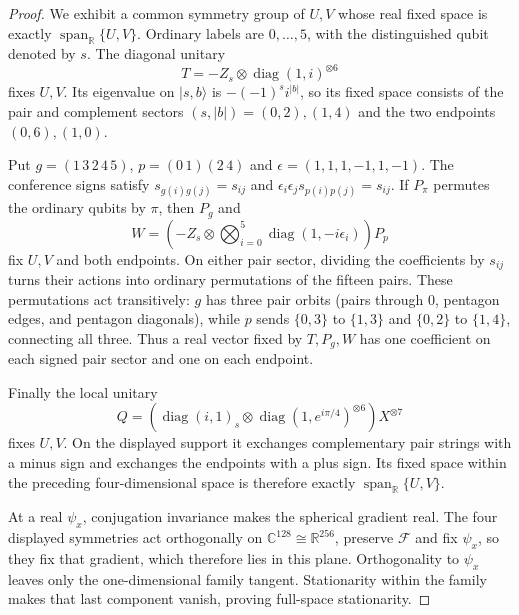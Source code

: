 \begin{proof}
We exhibit a common symmetry group of $U,V$ whose real fixed space is
exactly $\operatorname{span}_{\mathbb R}\{U,V\}$. Ordinary labels are $0,\ldots,5$,
with the distinguished qubit denoted by $s$.
The diagonal unitary
\[
 T=-Z_s\otimes\operatorname{diag}(1,i)^{\otimes6}
\]
fixes $U,V$. Its eigenvalue on $|s,b\rangle$ is $-(-1)^s i^{|b|}$,
so its fixed space consists of the pair and complement sectors
$(s,|b|)=(0,2),(1,4)$ and the two endpoints $(0,6),(1,0)$.

Put $g=(1\,3\,2\,4\,5)$, $p=(0\,1)(2\,4)$ and
$\epsilon=(1,1,1,-1,1,-1)$. The conference signs satisfy
$s_{g(i)g(j)}=s_{ij}$ and
$\epsilon_i\epsilon_j s_{p(i)p(j)}=s_{ij}$.
If $P_\pi$ permutes the ordinary qubits by $\pi$, then $P_g$ and
\[
 W=\left(-Z_s\otimes\bigotimes_{i=0}^5
           \operatorname{diag}(1,-i\epsilon_i)\right)P_p
\]
fix $U,V$ and both endpoints. On either pair sector, dividing the
coefficients by $s_{ij}$ turns their actions into ordinary permutations
of the fifteen pairs. These permutations act transitively: $g$ has
three pair orbits (pairs through $0$, pentagon edges, and pentagon
diagonals), while $p$ sends $\{0,3\}$ to $\{1,3\}$ and
$\{0,2\}$ to $\{1,4\}$, connecting all three.
Thus a real vector fixed by $T,P_g,W$ has one coefficient on each
signed pair sector and one on each endpoint.

Finally the local unitary
\[
 Q=\left(\operatorname{diag}(i,1)_s\otimes
       \operatorname{diag}(1,e^{i\pi/4})^{\otimes6}\right)X^{\otimes7}
\]
fixes $U,V$. On the displayed support it exchanges complementary
pair strings with a minus sign and exchanges the endpoints with a
plus sign. Its fixed space within the preceding four-dimensional
space is therefore exactly $\operatorname{span}_{\mathbb R}\{U,V\}$.

At a real $\psi_x$, conjugation invariance makes the spherical gradient
real. The four displayed symmetries act orthogonally on
$\mathbb C^{128}\cong\mathbb R^{256}$, preserve $\mathcal F$ and fix
$\psi_x$, so they fix that gradient, which therefore lies in this plane. Orthogonality to $\psi_x$ leaves only the
one-dimensional family tangent. Stationarity within the family makes that last component vanish,
proving full-space stationarity.
\end{proof}

